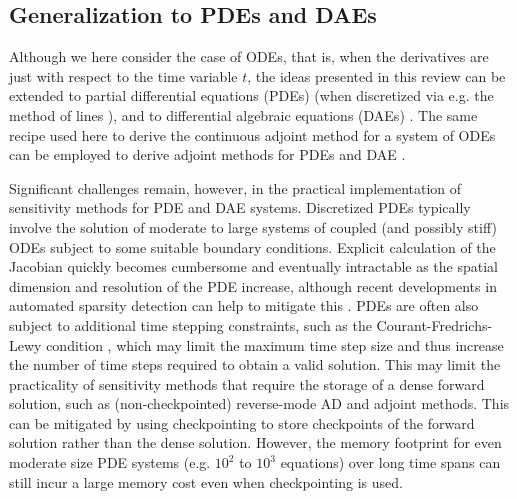 
\subsection{Generalization to PDEs and DAEs}



Although we here consider the case of ODEs, that is, when the derivatives are just with respect to the time variable $t$, the ideas presented in this review can be extended to partial differential equations (PDEs) (when discretized via e.g. the method of lines \cite{ascher2008numerical}), and to differential algebraic equations (DAEs) \cite{hairer-solving-2}.
The same recipe used here to derive the continuous adjoint method for a system of ODEs can be employed to derive adjoint methods for PDEs \cite{Giles_Pierce_2000} and DAE \cite{Cao_Li_Petzold_2002}. 

Significant challenges remain, however, in the practical implementation of sensitivity methods for PDE and DAE systems. 
Discretized PDEs typically involve the solution of moderate to large systems of coupled (and possibly stiff) ODEs subject to some suitable boundary conditions. 
Explicit calculation of the Jacobian quickly becomes cumbersome and eventually intractable as the spatial dimension and resolution of the PDE increase, although recent developments in automated sparsity detection can help to mitigate this \cite{gowdaSparsityProgrammingAutomated2019}.
PDEs are often also subject to additional time stepping constraints, such as the Courant-Fredrichs-Lewy condition \cite{courantPartialDifferenceEquations1967}, which may limit the maximum time step size and thus increase the number of time steps required to obtain a valid solution. 
This may limit the practicality of sensitivity methods that require the storage of a dense forward solution, such as (non-checkpointed) reverse-mode AD and adjoint methods.
This can be mitigated by using checkpointing to store checkpoints of the forward solution rather than the dense solution.
However, the memory footprint for even moderate size PDE systems (e.g. $10^2$ to $10^3$ equations) over long time spans can still incur a large memory cost even when checkpointing is used.

